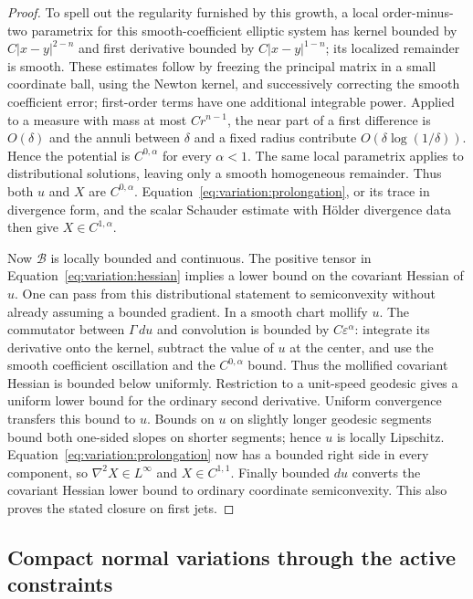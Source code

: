 \begin{proof}
To spell out the regularity furnished by this growth, a local
order-minus-two parametrix for this smooth-coefficient elliptic system
has kernel bounded by $C|x-y|^{2-n}$ and first derivative bounded by
$C|x-y|^{1-n}$; its localized remainder is smooth.  These estimates
follow by freezing the principal matrix in a small coordinate ball,
using the Newton kernel, and successively correcting the smooth
coefficient error; first-order terms have one additional integrable
power.  Applied to a measure with mass at most $Cr^{n-1}$, the near part
of a first difference is $O(\delta)$ and the annuli between $\delta$
and a fixed radius contribute $O(\delta\log(1/\delta))$.  Hence the
potential is $C^{0,\alpha}$ for every $\alpha<1$.  The same local
parametrix applies to distributional solutions, leaving only a smooth
homogeneous remainder.  Thus both $u$ and $X$ are $C^{0,\alpha}$.
Equation~\eqref{eq:variation:prolongation}, or its trace in divergence
form, and the scalar Schauder estimate with Hölder divergence data
then give $X\in C^{1,\alpha}$.

Now $\mathcal B$ is locally bounded and continuous.  The positive tensor
in Equation~\eqref{eq:variation:hessian} implies a lower bound on the covariant
Hessian of $u$.  One can pass from this distributional statement to
semiconvexity without already assuming a bounded gradient.  In a smooth
chart mollify $u$.  The commutator between $\Gamma\,du$ and convolution
is bounded by $C\varepsilon^\alpha$: integrate its derivative onto the
kernel, subtract the value of $u$ at the center, and use the smooth
coefficient oscillation and the $C^{0,\alpha}$ bound.  Thus the
mollified covariant Hessian is bounded below uniformly.  Restriction
to a unit-speed geodesic gives a uniform lower bound for the ordinary
second derivative.  Uniform convergence transfers this bound to $u$.
Bounds on $u$ on slightly longer geodesic segments bound both one-sided
slopes on shorter segments; hence $u$ is locally Lipschitz.  Equation~\eqref{eq:variation:prolongation} now has a bounded right side in every
component, so $\nabla^2X\in L^\infty$ and $X\in C^{1,1}$.  Finally
bounded $du$ converts the covariant Hessian lower bound to ordinary
coordinate semiconvexity.  This also proves the stated closure on
first jets.
\end{proof}

\subsection{Compact normal variations through the active constraints}

